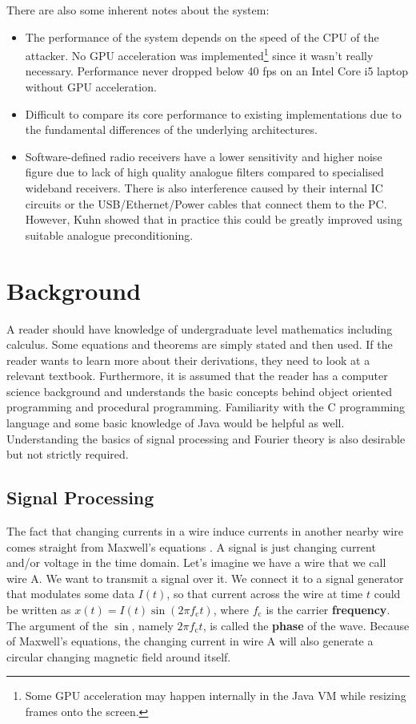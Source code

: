 \documentclass[a4paper,12pt,twoside,openright]{report}
\begin{document}
There are also some inherent notes about the system:
\begin{itemize}

  \item The performance of the system depends on the speed of the CPU of the attacker. No GPU acceleration was implemented\footnote{Some GPU acceleration may happen internally in the Java VM while resizing frames onto the screen.} since it wasn't really necessary. Performance never dropped below 40 fps on an Intel Core i5 laptop without GPU acceleration.
  \item Difficult to compare its core performance to existing implementations due to the fundamental differences of the underlying architectures.
  \item Software-defined radio receivers have a lower sensitivity and higher noise figure due to lack of high quality analogue filters compared to specialised wideband receivers. There is also interference caused by their internal IC circuits or the USB/Ethernet/Power cables that connect them to the PC. However, Kuhn showed that in practice this could be greatly improved using suitable analogue preconditioning.
  
\end{itemize}

\chapter{Background}
\label{chap:background}

A reader should have knowledge of undergraduate level mathematics including calculus. Some equations and theorems are simply stated and then used. If the reader wants to learn more about their derivations, they need to look at a relevant textbook. Furthermore, it is assumed that the reader has a computer science background and understands the basic concepts behind object oriented programming and procedural programming. Familiarity with the C programming language and some basic knowledge of Java would be helpful as well. Understanding the basics of signal processing and Fourier theory is also desirable but not strictly required.

\section{Signal Processing} 

The fact that changing currents in a wire induce currents in another nearby wire comes straight from Maxwell's equations \cite{maxwell1881treatise}. A signal is just changing current and/or voltage in the time domain. Let's imagine we have a wire that we call wire A. We want to transmit a signal over it. We connect it to a signal generator that modulates some data $I(t)$, so that current across the wire at time $t$ could be written as $x(t) = I(t) \sin(2\pi f_\text{c} t)$, where $f_\text{c}$ is the carrier \textbf{frequency}. The argument of the $\sin$, namely $2\pi f_\text{c} t$, is called the \textbf{phase} of the wave. Because of Maxwell's equations, the changing current in wire A will also generate a circular changing magnetic field around itself.
\end{document}
